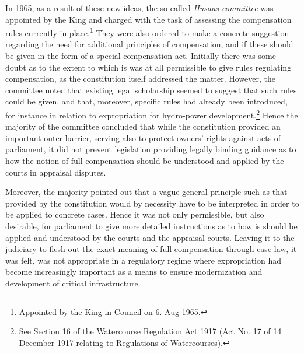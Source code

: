 \documentclass[10pt]{article} %
\begin{document}
In 1965, as a result of these new ideas, the so called \emph{Husaas committee} was appointed by the King and charged with the task of assessing the compensation rules currently in place.\footnote{Appointed by the King in Council on 6. Aug 1965.} They were also ordered to make a concrete suggestion regarding the need for additional principles of compensation, and if these should be given in the form of a special compensation act. Initially there was some doubt as to the extent to which is was at all permissible to give rules regulating compensation, as the constitution itself addressed the matter. However, the committee noted that existing legal scholarship seemed to suggest that such rules could be given, and that, moreover, specific rules had already been introduced, for instance in relation to expropriation for hydro-power development.\footnote{See Section 16 of the Watercourse Regulation Act 1917 (Act No. 17 of 14 December 1917 relating to Regulations of Watercourses).} Hence the majority of the committee concluded that while the constitution provided an important outer barrier, serving also to protect owners' rights against acts of parliament, it did not prevent legislation providing legally binding guidance as to how the notion of full compensation should be understood and applied by the courts in appraisal disputes.

Moreover, the majority pointed out that a vague general principle such as that provided by the constitution would by necessity have to be interpreted in order to be applied to concrete cases. Hence it was not only permissible, but also desirable, for parliament to give more detailed instructions as to how is should be applied and understood by the courts and the appraisal courts. Leaving it to the judiciary to flesh out the exact meaning of full compensation through case law, it was felt, was not appropriate in a regulatory regime where expropriation had become increasingly important as a means to ensure modernization and development of critical infrastructure. 

\end{document}
